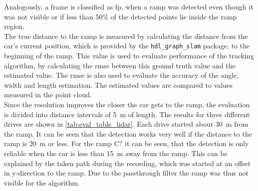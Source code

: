 Analogously, a frame is classified as \gls{fp}, when a ramp was detected even though it was not visible or if less than 50\% of the detected points lie inside the ramp region.\\
The true distance to the ramp is measured by calculating the distance from the car's current position, which is provided by the \texttt{hdl\_graph\_slam} package, to the beginning of the ramp.
This value is used to evaluate performance of the tracking algorithm, by calculating the \gls{rmse} between this ground truth value and the estimated value.
The \gls{rmse} is also used to evaluate the accuracy of the angle, width and length estimation.
The estimated values are compared to values measured in the point cloud.\\
Since the resolution improves the closer the car gets to the ramp, the evaluation is divided into distance intervals of \SI{5}{\metre} of length.
The results for three different drives are shown in \cref{tab:eval_table_lidar}.
Each drive started about \SI{30}{\metre} from the ramp.
It can be seen that the detection works very well if the distance to the ramp is \SI{20}{\metre} or less.
For the ramp C? it can be seen, that the detection is only reliable when the car is less than \SI{15}{\metre} away from the ramp.
This can be explained by the taken path during the recording, which was started at an offset in y-direction to the ramp.
Due to the passthrough filter the ramp was thus not visible for the algorithm.\\
